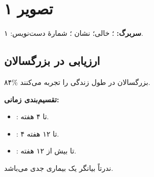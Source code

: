 \documentclass[12pt,a4paper]{article}
\begin{document}
\fi
\providecommand{\LBPpage}[1]{\clearpage\section*{تصویر #1}}
\providecommand{\LBPunclear}[1]{\textbf{[خوانش نامطمئن: #1]}}
\providecommand{\LBPm}[1]{\lr{\(#1\)}}

\begin{center}\Large\bfseries{}\end{center}

\LBPpage{۱}
\textbf{سربرگ:} ؛  خالی؛ نشان ؛ شمارهٔ دست‌نویس: ۱.
\subsection*{ارزیابی  در بزرگسالان}
۸۴\% بزرگسالان در طول زندگی  را تجربه می‌کنند.

\textbf{تقسیم‌بندی زمانی:}
\begin{itemize}
  \item {}: تا ۴ هفته.
  \item {}: ۴ تا ۱۲ هفته.
  \item {}: تا بیش از ۱۲ هفته.
\end{itemize}
ندرتاً  بیانگر یک بیماری جدی می‌باشد.
\end{document}
